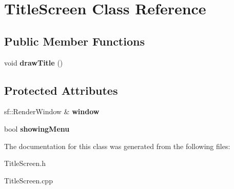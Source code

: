 \hypertarget{class_title_screen}{}\section{Title\+Screen Class Reference}
\label{class_title_screen}
\subsection*{Public Member Functions}
\begin{DoxyCompactItemize}
\item 
\hypertarget{class_title_screen_a9f61797a5fd970e8038034d5e0fec6e3}{}void {\bfseries draw\+Title} ()\label{class_title_screen_a9f61797a5fd970e8038034d5e0fec6e3}

\end{DoxyCompactItemize}
\subsection*{Protected Attributes}
\begin{DoxyCompactItemize}
\item 
\hypertarget{class_title_screen_a5edc8607f26a0a4e4e8189685e7fc679}{}sf\+::\+Render\+Window \& {\bfseries window}\label{class_title_screen_a5edc8607f26a0a4e4e8189685e7fc679}

\item 
\hypertarget{class_title_screen_a318f6b447af2a0fc03bfb448fed2d89d}{}bool {\bfseries showing\+Menu}\label{class_title_screen_a318f6b447af2a0fc03bfb448fed2d89d}

\end{DoxyCompactItemize}


The documentation for this class was generated from the following files\+:\begin{DoxyCompactItemize}
\item 
Title\+Screen.\+h\item 
Title\+Screen.\+cpp\end{DoxyCompactItemize}
